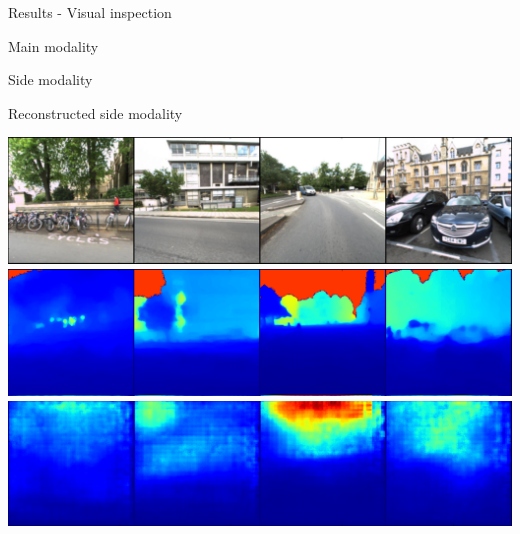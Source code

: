 \begin{frame}{Results - Visual inspection}
	\begin{minipage}[c][0.65\textheight]{0.19\linewidth}
		Main modality 
		\vspace{1.5cm}		
		
		Side modality
		\vspace{1.5cm}
		
		Reconstructed side modality
	\end{minipage}\hfill
	\begin{minipage}[c][0.7\textheight]{0.75\linewidth}
		\includegraphics[width=0.95\linewidth]{images/visual_results/mod_rgb.png}
		\vfill		
		\includegraphics[width=0.95\linewidth]{images/visual_results/gt_depth.png}
		\vfill		
		\includegraphics[width=0.95\linewidth]{images/visual_results/reconstructed_maps.png}
	\end{minipage}	
\end{frame}
